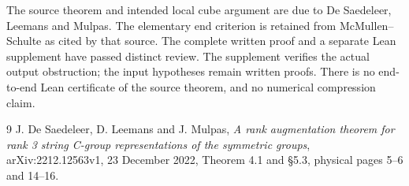 \documentclass[a4paper,11pt]{article}
\begin{document}
The source theorem and intended local cube argument are due to
De Saedeleer, Leemans and Mulpas. The elementary end criterion is retained
from McMullen--Schulte as cited by that source. The complete written proof and a separate Lean supplement have passed
distinct review. The supplement verifies the actual output obstruction;
the input hypotheses remain written proofs. There is no end-to-end Lean
certificate of the source theorem, and no numerical compression claim.

\begin{thebibliography}{9}
 J. De Saedeleer, D. Leemans and J. Mulpas,
\emph{A rank augmentation theorem for rank 3 string C-group representations
of the symmetric groups}, arXiv:2212.12563v1, 23 December 2022,
Theorem 4.1 and \S5.3, physical pages 5--6 and 14--16.
\end{thebibliography}
\end{document}
